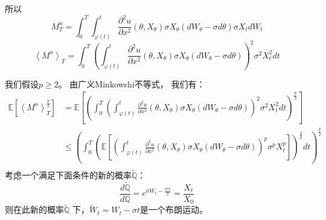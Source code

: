所以
\begin{equation}
M_T^n=\int_0^T\int_{\varphi(t)}^t \frac{\partial^2 u}{\partial x^2}(\theta, X_\theta)\sigma X_\theta (dW_\theta-\sigma d\theta)\sigma X_t dW_t
\end{equation}
\begin{equation}
\left \langle M^n \right \rangle_T=\int_0^T(\int_{\varphi(t)}^t \frac{\partial^2 u}{\partial x^2}(\theta, X_\theta)\sigma X_\theta (dW_\theta-\sigma d\theta))^2\sigma^2 X_t^2 dt
\end{equation}

我们假设$p\geq 2$。 由广义Minkowshi不等式， 我们有：
\begin{equation}
\begin{split} 
\mathbb{E}[\left \langle M^n \right \rangle_T^{\frac{p}{2}}]
&=\mathbb{E}[(\int_0^T(\int_{\varphi(t)}^t \frac{\partial^2 u}{\partial x^2}(\theta, X_\theta)\sigma X_\theta (dW_\theta-\sigma d\theta))^2\sigma^2 X_t^2 dt)^{\frac{p}{2}}]\\
&\leq (\int_0^T(\mathbb{E}[(\int_{\varphi(t)}^t \frac{\partial^2 u}{\partial x^2}(\theta, X_\theta)\sigma X_\theta (dW_\theta-\sigma d\theta))^p\sigma^p X_t^p] )^{\frac{2}{p}}dt)^{\frac{p}{2}}\\
\end{split}
\end{equation}
考虑一个满足下面条件的新的概率$\widetilde{\mathbb{Q}}$： 
\begin{equation}
\frac{d\widetilde{\mathbb{Q}}}{d\mathbb{Q}}=e^{\sigma W_t-\frac{\sigma^2t}{2}}=\frac{X_t}{X_0}
\end{equation}
则在此新的概率$\widetilde{\mathbb{Q}}$ 下，$\widetilde{W}_t=W_t-\sigma t$是一个布朗运动。

